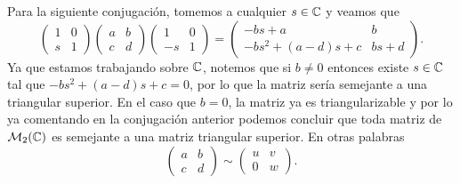 Para la siguiente conjugación, tomemos a cualquier $s \in \mathbb{C}$ y veamos que
\begin{equation}
  \begin{pmatrix} 1 & 0 \\ s & 1 \end{pmatrix}
  \begin{pmatrix} a & b \\ c & d \end{pmatrix}
  \begin{pmatrix} 1 & 0 \\ -s & 1 \end{pmatrix}
    = \begin{pmatrix} -bs+a & b \\ -bs^2 + (a-d)s + c  & bs+d \end{pmatrix}. \label{eq:ConjII}
\end{equation}
Ya que estamos trabajando sobre $\mathbb{C}$, notemos que si $b \neq 0$ entonces existe $s \in \mathbb{C}$ tal que $-bs^2 + (a-d)s + c = 0$, por lo que la matriz sería semejante a una triangular superior. En el caso que $b = 0$, la matriz ya es triangularizable y por lo ya comentando en la conjugación anterior podemos concluir que toda matriz de $\mathcal{M}_2(\mathbb{C})$ es semejante a una matriz triangular superior. En otras palabras
\[ 
    \begin{pmatrix} a & b \\ c & d \end{pmatrix} \sim \begin{pmatrix} u & v \\ 0 & w \end{pmatrix}.
\]

